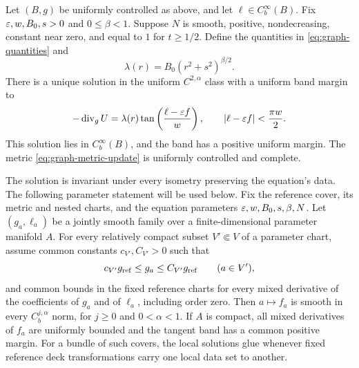 \begin{theorem}\label{thm:uniform-graph}
Let $(B,g)$ be uniformly controlled as above, and let $\ell\in C_b^\infty(B)$. Fix $\varepsilon,w,B_0,s>0$ and $0\le\beta<1$. Suppose $N$ is smooth, positive, nondecreasing, constant near zero, and equal to $1$ for $t\ge1/2$. Define the quantities in \eqref{eq:graph-quantities} and
\[
 \lambda(r)=B_0(r^2+s^2)^{\beta/2}.
\]
There is a unique solution in the uniform $C^{2,\alpha}$ class with a uniform band margin to
\begin{equation}\label{eq:graph-equation}
 -\operatorname{div}_g U
   =\lambda(r)\tan\left(\frac{\ell-\varepsilon f}{w}\right),
 \qquad \lvert\ell-\varepsilon f\rvert<\frac{\pi w}{2}.
\end{equation}
This solution lies in $C_b^\infty(B)$, and the band has a positive uniform margin.
The metric \eqref{eq:graph-metric-update} is uniformly controlled and complete.

The solution is invariant under every isometry preserving the equation's
data. The following parameter statement will be used below. Fix the
reference cover, its metric and nested charts, and the equation parameters
$\varepsilon,w,B_0,s,\beta,N$. Let $(g_a,\ell_a)$ be a jointly smooth family over
a finite-dimensional parameter manifold $A$. For every relatively compact
subset $V'\Subset V$ of a parameter chart, assume common constants
$c_{V'},C_{V'}>0$ such that
\[
 c_{V'}g_{\rm ref}\le g_a\le C_{V'}g_{\rm ref}\qquad(a\in V'),
\]
and common bounds in the fixed reference charts for every mixed derivative
of the coefficients of $g_a$ and of $\ell_a$, including order zero. Then
$a\mapsto f_a$ is smooth in every $C_b^{j,\alpha}$ norm, for $j\ge0$ and
$0<\alpha<1$. If $A$ is compact,
all mixed derivatives of $f_a$ are uniformly bounded and the tangent band
has a common positive margin. For a bundle of such covers, the local
solutions glue whenever fixed reference deck transformations carry one
local data set to another.
\end{theorem}

